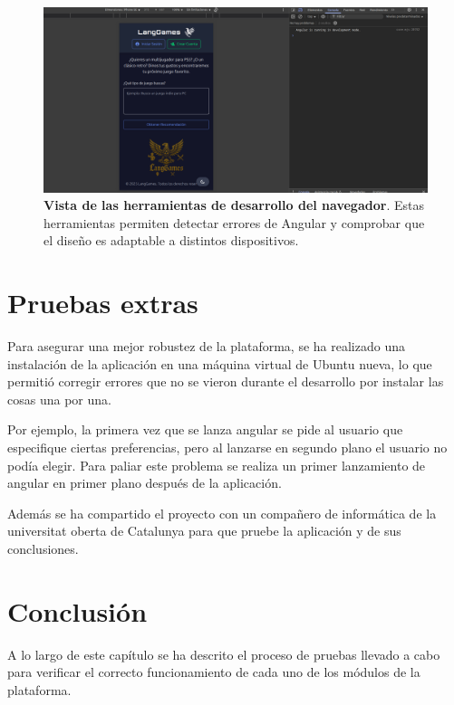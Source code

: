 \begin{figure}[H]
	\centering
	\includegraphics[width=1\linewidth]{imagenes/consolaNavegador.png}
	\caption[\textbf{Vista de las herramientas de desarrollo del navegador}.]{\textbf{Vista de las herramientas de desarrollo del navegador}. Estas herramientas permiten detectar errores de Angular y comprobar que el diseño es adaptable a distintos dispositivos.}
	\label{consola-navegador}
\end{figure}

\newpage

\section{Pruebas extras}

Para asegurar una mejor robustez de la plataforma, se ha realizado una instalación de la aplicación en una máquina virtual de Ubuntu nueva, lo que permitió corregir errores que no se vieron durante el desarrollo por instalar las cosas una por una. 

Por ejemplo, la primera vez que se lanza angular se pide al usuario que especifique ciertas preferencias, pero al lanzarse en segundo plano el usuario no podía elegir. Para paliar este problema se realiza un primer lanzamiento de angular en primer plano después de la aplicación.


Además se ha compartido el proyecto con un compañero de informática de la universitat oberta de Catalunya para que pruebe la aplicación y de sus conclusiones. 

\newpage

\section{Conclusión}

A lo largo de este capítulo se ha descrito el proceso de pruebas llevado a cabo para verificar el correcto funcionamiento de cada uno de los módulos de la plataforma.

